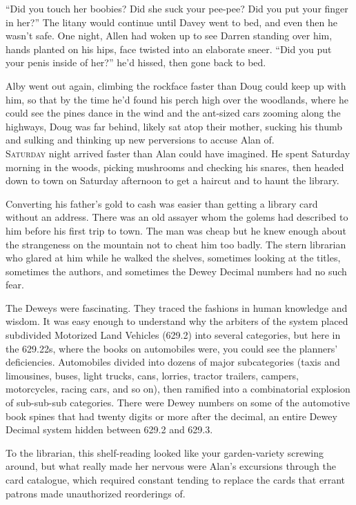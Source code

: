 \documentclass{article}
\begin{document}
``Did you touch her boobies?  Did she suck your pee-pee?  Did you put
your finger in her?'' The litany would continue until Davey went to
bed, and even then he wasn't safe.  One night, Allen had woken up to
see Darren standing over him, hands planted on his hips, face twisted
into an elaborate sneer.  ``Did you put your penis inside of her?''
he'd hissed, then gone back to bed.

Alby went out again, climbing the rockface faster than Doug could keep
up with him, so that by the time he'd found his perch high over the
woodlands, where he could see the pines dance in the wind and the
ant-sized cars zooming along the highways, Doug was far behind, likely
sat atop their mother, sucking his thumb and sulking and thinking up
new perversions to accuse Alan of.
\\
\lettrine[lines=3, lhang=.5, nindent=0pt, findent=2pt]{S}{aturday} night arrived faster than Alan could have imagined.  He spent
Saturday morning in the woods, picking mushrooms and checking his
snares, then headed down to town on Saturday afternoon to get a
haircut and to haunt the library.

Converting his father's gold to cash was easier than getting a library
card without an address.  There was an old assayer whom the golems had
described to him before his first trip to town.  The man was cheap but
he knew enough about the strangeness on the mountain not to cheat him
too badly.  The stern librarian who glared at him while he walked the
shelves, sometimes looking at the titles, sometimes the authors, and
sometimes the Dewey Decimal numbers had no such fear.

The Deweys were fascinating.  They traced the fashions in human
knowledge and wisdom.  It was easy enough to understand why the
arbiters of the system placed subdivided Motorized Land Vehicles
(629.2) into several categories, but here in the 629.22s, where the
books on automobiles were, you could see the planners' deficiencies. 
Automobiles divided into dozens of major subcategories (taxis and
limousines, buses, light trucks, cans, lorries, tractor trailers,
campers, motorcycles, racing cars, and so on), then ramified into a
combinatorial explosion of sub-sub-sub categories.  There were Dewey
numbers on some of the automotive book spines that had twenty digits
or more after the decimal, an entire Dewey Decimal system hidden
between 629.2 and 629.3.

To the librarian, this shelf-reading looked like your garden-variety
screwing around, but what really made her nervous were Alan's
excursions through the card catalogue, which required constant tending
to replace the cards that errant patrons made unauthorized reorderings
of.
\end{document}

